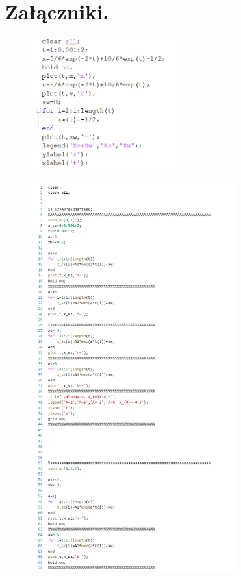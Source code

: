 \documentclass{article}
\begin{document}
\section{Załączniki.}
\begin{figure}[h!]
    \centering
    \includegraphics[width=0.5\textwidth]{kod1.png}
    \label{fig:my_label}
\end{figure}
\begin{figure}
    \centering
    \includegraphics[width=0.7\textwidth]{a_1_m.png}
    \label{fig:my_label}
\end{figure}
\end{document}
